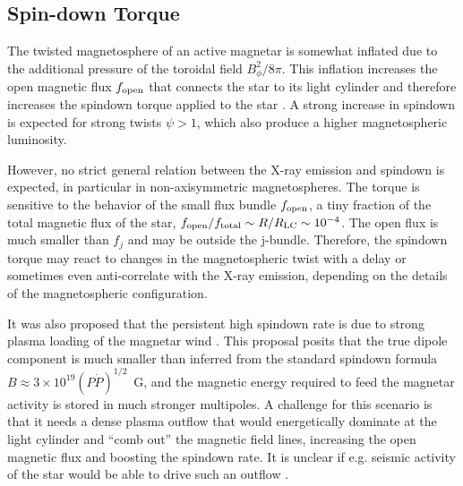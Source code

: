 \subsection{Spin-down Torque}


The twisted magnetosphere of an active magnetar is somewhat inflated due to the 
additional pressure of the toroidal field $B_\phi^2/8\pi$. 
This inflation increases the open magnetic 
flux $f_{\rm open}$ that connects the star to its light cylinder and therefore increases 
the spindown torque applied to the star \citep{tlk02}. 
A strong increase in spindown is expected for strong twists 
$\psi>1$, which also produce a higher magnetospheric luminosity.

However, no strict general relation between the X-ray emission and spindown 
is expected, in particular in non-axisymmetric magnetospheres. 
The torque is sensitive to the 
behavior of the small flux bundle $f_{\rm open}$, a tiny fraction of the total magnetic flux 
of the star, $f_{\rm open}/f_{\rm total}\sim R/R_{\rm LC}\sim 10^{-4}$. 
The open flux is much smaller than $f_j$ and may be outside the j-bundle. 
Therefore, the spindown torque may react to changes 
in the magnetospheric twist with a delay or sometimes even anti-correlate with 
the X-ray emission, depending on the details of the magnetospheric configuration.

It was also proposed that the persistent high spindown rate is due to strong plasma 
loading of the magnetar wind \citep{hck99,txs+13}. This proposal posits that the true 
dipole component is much smaller than inferred from the standard spindown formula 
$B\approx 3\times 10^{19}(P\dot{P})^{1/2}$~G, and the magnetic energy required to 
feed the magnetar activity is stored in much stronger multipoles. A challenge for 
this scenario is that it needs a dense plasma outflow that would energetically 
dominate at the light cylinder and ``comb out'' the magnetic field lines,  increasing 
the open magnetic flux and boosting the spindown rate. 
It is unclear if e.g. seismic activity of the star would be able to drive such an outflow 
 \citep{tdw+00}.

